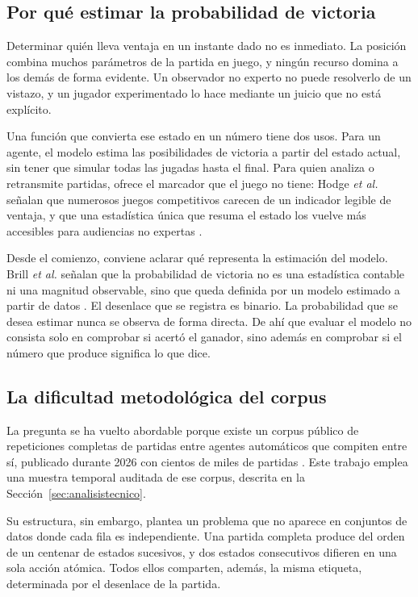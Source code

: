 \subsection{Por qué estimar la probabilidad de victoria}
\label{subsec:relevancia}

Determinar quién lleva ventaja en un instante dado no es inmediato. La
posición combina muchos parámetros de la partida en juego, y ningún
recurso domina a los demás de forma evidente. Un observador no experto no
puede resolverlo de un vistazo, y un jugador experimentado lo hace mediante
un juicio que no está explícito.

Una función que convierta ese estado en un número tiene dos usos. Para un
agente, el modelo estima las posibilidades de victoria a partir del estado
actual, sin tener que simular todas las jugadas hasta el final. Para quien
analiza o retransmite partidas, ofrece el
marcador que el juego no tiene: Hodge \textit{et al.} señalan que numerosos
juegos competitivos carecen de un indicador legible de ventaja, y que una
estadística única que resuma el estado los vuelve más accesibles para
audiencias no expertas \cite{hodge_winprediction_2021}.

Desde el comienzo, conviene aclarar qué representa la estimación del modelo.
Brill \textit{et al.} señalan que la probabilidad de victoria no es una
estadística contable ni una magnitud observable, sino que queda definida por
un modelo estimado a partir de datos \cite{brill_winprob_2026}. El desenlace
que se registra es binario. La probabilidad que se desea estimar nunca se
observa de forma directa. De ahí que evaluar el modelo no consista solo en
comprobar si acertó el ganador, sino además en comprobar si el número que
produce significa lo que dice.

\subsection{La dificultad metodológica del corpus}
\label{subsec:dificultad}

La pregunta se ha vuelto abordable porque existe un corpus público de
repeticiones completas de partidas entre agentes automáticos que compiten
entre sí, publicado durante 2026 con cientos de
miles de partidas \cite{ptcg_dataset_2026}. Este trabajo emplea una muestra
temporal auditada de ese corpus, descrita en la
Sección~\ref{sec:analisistecnico}.

Su estructura, sin embargo, plantea un problema que no aparece en conjuntos
de datos donde cada fila es independiente. Una partida completa produce del
orden de un centenar de estados sucesivos, y dos estados consecutivos
difieren en una sola acción atómica. Todos ellos comparten, además, la misma etiqueta, determinada por el desenlace de la partida.

